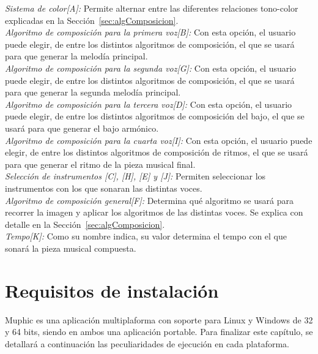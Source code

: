 		\noindent\textit{Sistema de color[A]:} Permite alternar entre las diferentes relaciones tono-color explicadas en la Sección~\ref{sec:algComposicion}.\\
		
		\noindent\textit{Algoritmo de composición para la primera voz[B]:} Con esta opción, el usuario puede elegir, de entre los distintos algoritmos de composición, el que se usará para que generar la melodía principal.\\
		
		\noindent\textit{Algoritmo de composición para la segunda voz[G]:} Con esta opción, el usuario puede elegir, de entre los distintos algoritmos de composición, el que se usará para que generar la segunda melodía principal.\\

		\noindent\textit{Algoritmo de composición para la tercera voz[D]:} Con esta opción, el usuario puede elegir, de entre los distintos algoritmos de composición del bajo, el que se usará para que generar el bajo armónico.\\
		
		\noindent\textit{Algoritmo de composición para la cuarta voz[I]:} Con esta opción, el usuario puede elegir, de entre los distintos algoritmos de composición de ritmos, el que se usará para que generar el ritmo de la pieza musical final.\\
		
		\noindent\textit{Selección de instrumentos [C], [H], [E] y [J]:} Permiten seleccionar los instrumentos con los que sonaran las distintas voces.\\

		\noindent\textit{Algoritmo de composición general[F]:} Determina qué algoritmo se usará para recorrer la imagen y aplicar los algoritmos de las distintas voces. Se explica con detalle en la Sección~\ref{sec:algComposicion}.\\

		\noindent\textit{Tempo[K]:} Como su nombre indica, su valor determina el tempo con el que sonará la pieza musical compuesta.\\
		
	\section{Requisitos de instalación}
	\label{sec:reqinstalacion}
	
		Muphic es una aplicación multiplaforma con soporte para Linux y Windows de 32 y 64 bits, siendo en ambos una aplicación portable. Para finalizar este capítulo, se detallará a continuación las peculiaridades de ejecución en cada plataforma.
		
